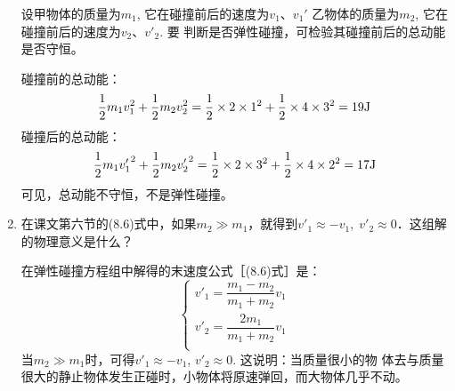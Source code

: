 \begin{enumerate}
\begin{solution}
    设甲物体的质量为$m_1$, 它在碰撞前后的速度为$v_1$、$v_1'$
    乙物体的质量为$m_2$, 它在碰撞前后的速度为$v_2$、$v'_2$. 要
    判断是否弹性碰撞，可检验其碰撞前后的总动能是否守恒。
    
    碰撞前的总动能：
\[\frac{1}{2}m_1v_1^2+\frac{1}{2}m_2v_2^2=\frac{1}{2}\times 2\times 1^2+\frac{1}{2}\times 4\times 3^2=19{\rm J}\]
碰撞后的总动能：
\[\frac{1}{2}m_1{v'_1}^2+\frac{1}{2}m_2{v'_2}^2=\frac{1}{2}\times 2\times 3^2+\frac{1}{2}\times 4\times 2^2=17{\rm J}\]
可见，总动能不守恒，不是弹性碰撞。
\end{solution}
\item 在课文第六节的(8.6)式中，如果$m_2\gg m_1$，就得到$v'_1\approx -v_1,\; v'_2\approx 0$．这组解的物理意义是什么？


\begin{solution}
    在弹性碰撞方程组中解得的末速度公式［(8.6)式］是：
    \[\begin{cases}
        v'_1=\dfrac{m_1-m_2}{m_1+m_2}v_1\\
        v'_2=\dfrac{2m_1}{m_1+m_2}v_1\\
        \end{cases}\]
当$m_2\gg m_1$时，可得$v'_1\approx -v_1$, $v'_2\approx 0$. 这说明：当质量很小的物
体去与质量很大的静止物体发生正碰时，小物体将原速弹回，而大物体几乎不动。
\end{solution}
\end{enumerate}



